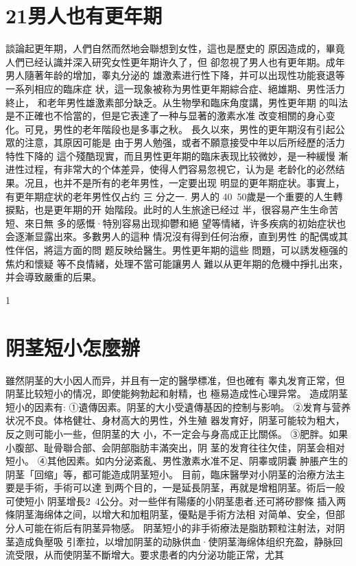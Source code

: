 \documentclass[12pt,UTF8]{ctexbook}
\begin{document}
\section{21男人也有更年期}
談論起更年期，人們自然而然地会聯想到女性，這也是歷史的
原因造成的，畢竟人們已经认識并深入研究女性更年期许久了，但
卻忽視了男人也有更年期。成年男人隨著年龄的增加，睾丸分泌的
雄激素进行性下降，并可以出现性功能衰退等一系列相应的臨床症
状，這一现象被称为男性更年期綜合症、絕雄期、男性活力終止，
和老年男性雄激素部分缺乏。从生物學和臨床角度講，男性更年期
的叫法是不正確也不恰當的，但是它表達了一种与显著的激素水准
改变相關的身心变化。可見，男性的老年階段也是多事之秋。
長久以來，男性的更年期沒有引起公眾的注意，其原因可能是
由于男人勉强，或者不願意接受中年以后所经歷的活力特性下降的
這个殘酷现實，而且男性更年期的臨床表现比较微妙，是一种緩慢
漸进性过程，有非常大的个体差异，使得人們容易忽視它，认为是
老龄化的必然结果。况且，也并不是所有的老年男性，一定要出现
明显的更年期症状。事實上，有更年期症状的老年男性仅占约 三
分之一.
男人的 40~50歲是一个重要的人生轉捩點，也是更年期的开
始階段。此时的人生旅途已经过
半，很容易产生生命苦短、來日無
多的感慨·特別容易出现抑鬱和絕
望等情緒，许多疾病的初始症状也
会逐漸显露出來。多數男人的這种
情况沒有得到任何治療，直到男性
的配偶或其性伴侶，將這方面的問
题反映给醫生。男性更年期的這些
問題，可以誘发極强的焦灼和懷疑
等不良情緒，处理不當可能讓男人
難以从更年期的危機中掙扎出來，
并会導致嚴重的后果。

1
\section{阴茎短小怎麼辦}
雖然阴茎的大小因人而异，并且有一定的醫學標准，但也確有
睾丸发育正常，但阴茎比较短小的情况，即使能夠勃起和射精，也
極易造成性心理异常。
造成阴茎短小的因素有:
①遺傳因素。阴茎的大小受遺傳基因的控制与影响。
②发育与营养状况不良。体格健壮、身材高大的男性，外生殖
器发育好，阴茎可能较为粗大，反之则可能小一些，但阴茎的大
小，不一定会与身高成正比關係。
③肥胖。如果小腹部、耻骨聯合部、会阴部脂肪丰滿突出，阴
茎的发育往往欠佳，阴茎会相对短小。
④其他因素。如内分泌紊亂、男性激素水准不足、阴睾或阴囊
肿脹产生的阴茎「回缩」等，都可能造成阴茎短小。
目前，臨床醫學对小阴茎的治療方法主要是手術，手術可以達
到两个目的，一是延長阴茎，再就是增粗阴茎。術后一般可使短小
阴茎增長2~4公分。对一些伴有陽痿的小阴茎患者,还可將矽膠條
插入两條阴茎海绵体之间，以增大和加粗阴茎，優點是手術方法相
对简单、安全，但部分人可能在術后有阴茎异物感。
阴茎短小的非手術療法是脂肪颗粒注射法，对阴茎造成負壓吸
引牽拉，以增加阴茎的动脉供血·使阴茎海绵体组织充盈，静脉回
流受限，从而使阴茎不斷增大。要求患者的内分泌功能正常，尤其
\end{document}
